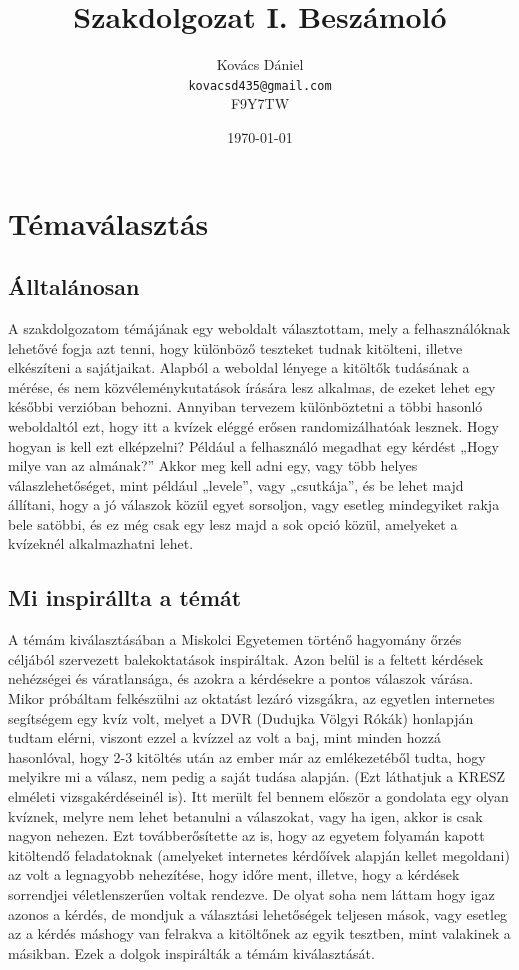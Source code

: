 \documentclass[a4paper,12pt]{article}
\title{Szakdolgozat I. Beszámoló}
\author{Kovács Dániel \\
\texttt{kovacsd435@gmail.com} \\
F9Y7TW}
\date{\today}
\begin{document}
\maketitle
\newpage
\tableofcontents
\newpage

\section{Témaválasztás}
\subsection{Álltalánosan}
A szakdolgozatom témájának egy weboldalt választottam, mely a felhasználóknak lehetővé fogja azt tenni, hogy különböző teszteket tudnak kitölteni, illetve elkészíteni a sajátjaikat. Alapból a weboldal lényege a kitöltők tudásának a mérése, és nem közvéleménykutatások írására lesz alkalmas, de ezeket lehet egy későbbi verzióban behozni. Annyiban tervezem különböztetni a többi hasonló weboldaltól ezt, hogy itt a kvízek eléggé erősen randomizálhatóak lesznek. Hogy hogyan is kell ezt elképzelni? Például a felhasználó megadhat egy kérdést „Hogy milye van az almának?” Akkor meg kell adni egy, vagy több helyes válaszlehetőséget, mint például „levele”, vagy „csutkája”, és be lehet majd állítani, hogy a jó válaszok közül egyet sorsoljon, vagy esetleg mindegyiket rakja bele satöbbi, és ez még csak egy lesz majd a sok opció közül, amelyeket a kvízeknél alkalmazhatni lehet.
\subsection{Mi inspirállta a témát}
A témám kiválasztásában a Miskolci Egyetemen történő hagyomány őrzés céljából szervezett balekoktatások inspiráltak. Azon belül is a feltett kérdések nehézségei és váratlansága, és azokra a kérdésekre a pontos válaszok várása. Mikor próbáltam felkészülni az oktatást lezáró vizsgákra, az egyetlen internetes segítségem egy kvíz volt, melyet a DVR (Dudujka Völgyi Rókák) honlapján tudtam elérni, viszont ezzel a kvízzel az volt a baj, mint minden hozzá hasonlóval, hogy 2-3 kitöltés után az ember már az emlékezetéből tudta, hogy melyikre mi a válasz, nem pedig a saját tudása alapján. (Ezt láthatjuk a KRESZ elméleti vizsgakérdéseinél is). Itt merült fel bennem először a gondolata egy olyan kvíznek, melyre nem lehet betanulni a válaszokat, vagy ha igen, akkor is csak nagyon nehezen. Ezt továbberősítette az is, hogy az egyetem folyamán kapott kitöltendő feladatoknak (amelyeket internetes kérdőívek alapján kellet megoldani) az volt a legnagyobb nehezítése, hogy időre ment, illetve, hogy a kérdések sorrendjei véletlenszerűen voltak rendezve. De olyat soha nem láttam hogy igaz azonos a kérdés, de mondjuk a választási lehetőségek teljesen mások, vagy esetleg az a kérdés máshogy van felrakva a kitöltőnek az egyik tesztben, mint valakinek a másikban. Ezek a dolgok inspirálták a témám kiválasztását.
\end{document}

